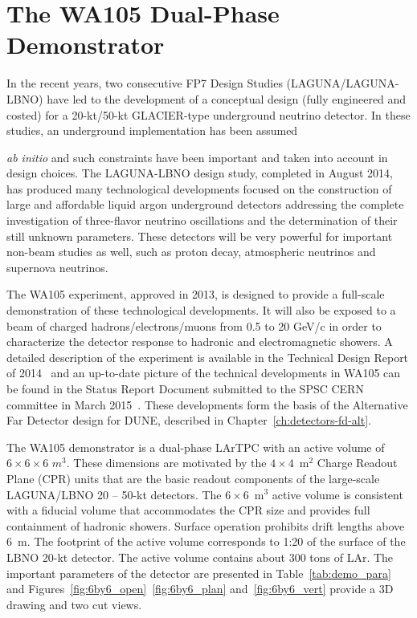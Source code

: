 \section{The WA105 Dual-Phase Demonstrator}
\label{sec:proto-cern-double}

 In the recent years, two consecutive FP7 Design Studies (LAGUNA/LAGUNA-LBNO) have led to the development of a conceptual design (fully engineered and costed) for a 20-kt/50-kt GLACIER-type underground neutrino detector. In these studies, an underground implementation has been assumed {\textit{ab initio}
and such constraints have been important and taken into account in design choices. The LAGUNA-LBNO design study, completed in August 2014, has produced many technological developments focused on the construction of  large and affordable liquid argon underground detectors addressing the complete investigation of three-flavor neutrino oscillations and the determination of their still unknown parameters. 
%
These detectors will be %
very powerful for important non-beam studies as well, such as proton decay, atmospheric neutrinos and supernova neutrinos. 

The WA105 experiment, approved in 2013, is designed to provide a full-scale demonstration of these technological developments. It will also be
exposed to a beam of charged hadrons/electrons/muons from 0.5 to 20 GeV/c in order to
characterize the detector response to hadronic and electromagnetic showers. %
 A detailed description of the experiment is available in the Technical Design Report of 2014~\cite{WA105_TDR} and an 
 up-to-date picture of the technical developments in WA105 can be found in the Status Report Document submitted to the SPSC CERN committee in  March 2015~\cite{WA105_SREP}. These developments form %
 the basis of the Alternative Far Detector design for DUNE, described in Chapter~\ref{ch:detectors-fd-alt}.

The WA105 demonstrator is a dual-phase LArTPC with an active volume of $6\times 6\times 6$ $m^3$. 
These dimensions are motivated by the  $4\times 4$~m$^2$ Charge Readout Plane (CPR) units that are the  basic readout components of the large-scale LAGUNA/LBNO 
20 -- 50-kt detectors.
%
The $6\times6$~m$^3$  active volume is consistent with a fiducial volume that accommodates the CPR size and provides %
full containment of hadronic showers.
%
Surface operation prohibits drift lengths above 6~m. The footprint of the active volume corresponds to 1:20 of the surface of the LBNO 20-kt detector. The active volume contains about 300 tons of LAr. The important parameters of the detector are presented in Table~\ref{tab:demo_para} and Figures~\ref{fig:6by6_open}~\ref{fig:6by6_plan} and~\ref{fig:6by6_vert} provide a 3D drawing and two cut views.

}
